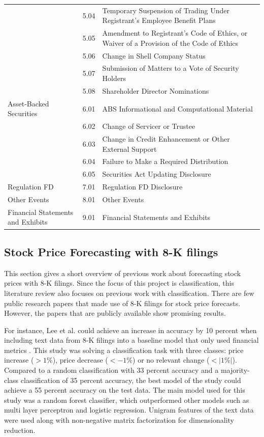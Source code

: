 \documentclass{article}
\begin{document}
\begin{table}[h!]
\begin{tabularx}{\textwidth}{|X|l|X|}
		& 5.04 & Temporary Suspension of Trading Under Registrant's Employee Benefit Plans \\
		& 5.05 & Amendment to Registrant's Code of Ethics, or Waiver of a Provision of the Code of Ethics \\
		& 5.06 & Change in Shell Company Status \\
		& 5.07 & Submission of Matters to a Vote of Security Holders \\
		& 5.08 & Shareholder Director Nominations \\
		Asset-Backed Securities & 6.01 & ABS Informational and Computational Material \\
		& 6.02 & Change of Servicer or Trustee \\
		& 6.03 & Change in Credit Enhancement or Other External Support \\
		& 6.04 & Failure to Make a Required Distribution \\
		& 6.05 & Securities Act Updating Disclosure \\
		Regulation FD & 7.01 & Regulation FD Disclosure \\
		Other Events & 8.01 & Other Events \\
		Financial Statements and Exhibits & 9.01 & Financial Statements and Exhibits \\
		\bottomrule
	\end{tabularx}

	\end{table}%

	\subsection{Stock Price Forecasting with 8-K filings}
	
	This section gives a short overview of previous work about forecasting stock prices with 8-K filings. Since the focus of this project is classification, this literature review also focuses on previous work with classification. There are few public research papers that made use of 8-K filings for stock price forecasts. However, the papers that are publicly available show promising results. 
	
	For instance, Lee et al. could achieve an increase in accuracy by 10 percent when including text data from 8-K filings into a baseline model that only used financial metrics \cite{lee_importance_2014}. This study was solving a classification task with three classes: price increase ($> 1\%$), price decrease ($< -1\%$) or no relevant change ($< |1 \%|$). Compared to a random classification with 33 percent accuracy and a majority-class classification of 35 percent accuracy, the best model of the study could achieve a 55 percent accuracy on the test data. The main model used for this study was a random forest classifier, which outperformed other models such as multi layer perceptron and logistic regression. Unigram features of the text data were used along with non-negative matrix factorization for dimensionality reduction.
	
\end{document}
